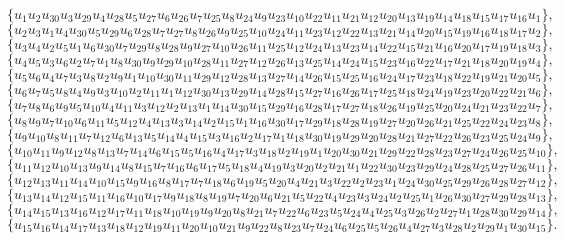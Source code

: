 \documentclass[12pt]{report}
\begin{document}
$$\{u_1u_2u_{30}u_3u_{29}u_4u_{28}u_5u_{27}u_6u_{26}u_7u_{25}u_8u_{24}u_9u_{23}u_{10}u_{22}u_{11}u_{21}u_{12}u_{20}u_{13}u_{19}u_{14}u_{18}u_{15}u_{17}u_{16}u_1\},$$
$$\{u_2u_3u_{1}u_4u_{30}u_5u_{29}u_6u_{28}u_7u_{27}u_8u_{26}u_9u_{25}u_{10}u_{24}u_{11}u_{23}u_{12}u_{22}u_{13}u_{21}u_{14}u_{20}u_{15}u_{19}u_{16}u_{18}u_{17}u_2\},$$
$$\{u_3u_4u_{2}u_5u_{1}u_6u_{30}u_7u_{29}u_8u_{28}u_9u_{27}u_{10}u_{26}u_{11}u_{25}u_{12}u_{24}u_{13}u_{23}u_{14}u_{22}u_{15}u_{21}u_{16}u_{20}u_{17}u_{19}u_{18}u_3\},$$
$$\{u_4u_5u_{3}u_6u_{2}u_7u_{1}u_8u_{30}u_9u_{29}u_{10}u_{28}u_{11}u_{27}u_{12}u_{26}u_{13}u_{25}u_{14}u_{24}u_{15}u_{23}u_{16}u_{22}u_{17}u_{21}u_{18}u_{20}u_{19}u_4\},$$
$$\{u_5u_6u_{4}u_7u_{3}u_8u_{2}u_9u_{1}u_{10}u_{30}u_{11}u_{29}u_{12}u_{28}u_{13}u_{27}u_{14}u_{26}u_{15}u_{25}u_{16}u_{24}u_{17}u_{23}u_{18}u_{22}u_{19}u_{21}u_{20}u_5\},$$
$$\{u_6u_7u_{5}u_8u_{4}u_9u_{3}u_{10}u_{2}u_{11}u_{1}u_{12}u_{30}u_{13}u_{29}u_{14}u_{28}u_{15}u_{27}u_{16}u_{26}u_{17}u_{25}u_{18}u_{24}u_{19}u_{23}u_{20}u_{22}u_{21}u_6\},$$
$$\{u_7u_8u_{6}u_9u_{5}u_{10}u_{4}u_{11}u_{3}u_{12}u_{2}u_{13}u_{1}u_{14}u_{30}u_{15}u_{29}u_{16}u_{28}u_{17}u_{27}u_{18}u_{26}u_{19}u_{25}u_{20}u_{24}u_{21}u_{23}u_{22}u_7\},$$
$$\{u_8u_9u_{7}u_{10}u_{6}u_{11}u_{5}u_{12}u_{4}u_{13}u_{3}u_{14}u_{2}u_{15}u_{1}u_{16}u_{30}u_{17}u_{29}u_{18}u_{28}u_{19}u_{27}u_{20}u_{26}u_{21}u_{25}u_{22}u_{24}u_{23}u_8\},$$
$$\{u_9u_{10}u_{8}u_{11}u_{7}u_{12}u_{6}u_{13}u_{5}u_{14}u_{4}u_{15}u_{3}u_{16}u_{2}u_{17}u_{1}u_{18}u_{30}u_{19}u_{29}u_{20}u_{28}u_{21}u_{27}u_{22}u_{26}u_{23}u_{25}u_{24}u_9\},$$
$$\{u_{10}u_{11}u_{9}u_{12}u_{8}u_{13}u_{7}u_{14}u_{6}u_{15}u_{5}u_{16}u_{4}u_{17}u_{3}u_{18}u_{2}u_{19}u_{1}u_{20}u_{30}u_{21}u_{29}u_{22}u_{28}u_{23}u_{27}u_{24}u_{26}u_{25}u_{10}\},$$
$$\{u_{11}u_{12}u_{10}u_{13}u_{9}u_{14}u_{8}u_{15}u_{7}u_{16}u_{6}u_{17}u_{5}u_{18}u_{4}u_{19}u_{3}u_{20}u_{2}u_{21}u_{1}u_{22}u_{30}u_{23}u_{29}u_{24}u_{28}u_{25}u_{27}u_{26}u_{11}\},$$
$$\{u_{12}u_{13}u_{11}u_{14}u_{10}u_{15}u_{9}u_{16}u_{8}u_{17}u_{7}u_{18}u_{6}u_{19}u_{5}u_{20}u_{4}u_{21}u_{3}u_{22}u_{2}u_{23}u_{1}u_{24}u_{30}u_{25}u_{29}u_{26}u_{28}u_{27}u_{12}\},$$
$$\{u_{13}u_{14}u_{12}u_{15}u_{11}u_{16}u_{10}u_{17}u_{9}u_{18}u_{8}u_{19}u_{7}u_{20}u_{6}u_{21}u_{5}u_{22}u_{4}u_{23}u_{3}u_{24}u_{2}u_{25}u_{1}u_{26}u_{30}u_{27}u_{29}u_{28}u_{13}\},$$
$$\{u_{14}u_{15}u_{13}u_{16}u_{12}u_{17}u_{11}u_{18}u_{10}u_{19}u_{9}u_{20}u_{8}u_{21}u_{7}u_{22}u_{6}u_{23}u_{5}u_{24}u_{4}u_{25}u_{3}u_{26}u_{2}u_{27}u_{1}u_{28}u_{30}u_{29}u_{14}\},$$
$$\{u_{15}u_{16}u_{14}u_{17}u_{13}u_{18}u_{12}u_{19}u_{11}u_{20}u_{10}u_{21}u_{9}u_{22}u_{8}u_{23}u_{7}u_{24}u_{6}u_{25}u_{5}u_{26}u_{4}u_{27}u_{3}u_{28}u_{2}u_{29}u_{1}u_{30}u_{15}\}.$$
\end{document}
